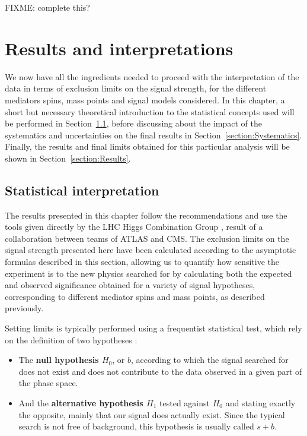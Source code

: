 \documentclass[a4paper, 10pt, openright]{report}
\begin{document}
\color{red}FIXME: complete this? \color{black}


















\chapter{Results and interpretations} \label{chapter:FinalResults}

We now have all the ingredients needed to proceed with the interpretation of the data in terms of exclusion limits on the signal strength, for the different mediators spins, mass points and signal models considered. In this chapter, a short but necessary theoretical introduction to the statistical concepts used will be performed in Section~\ref{section:Statistics}, before discussing about the impact of the systematics and uncertainties on the final results in Section~\ref{section:Systematics}. Finally, the results and final limits obtained for this particular analysis will be shown in Section~\ref{section:Results}.

\section{Statistical interpretation} \label{section:Statistics}

The results presented in this chapter follow the recommendations and use the tools given directly by the \ac{LHC} Higgs Combination Group \cite{combine}, result of a collaboration between teams of \ac{ATLAS} and \ac{CMS}. The exclusion limits on the signal strength presented here have been calculated according to the asymptotic formulas described in this section, allowing us to quantify how sensitive the experiment is to the new physics searched for by calculating both the expected and observed significance obtained for a variety of signal hypotheses, corresponding to different mediator spins and mass points, as described previously.

Setting limits is typically performed using a frequentist statistical test, which rely on the definition of two hypotheses \cite{stat1, stat2}: 
 
\begin{itemize} 
\item The \textbf{null hypothesis $H_0$}, or $b$, according to which the signal searched for does not exist and does not contribute to the data observed in a given part of the phase space.
\item And the \textbf{alternative hypothesis $H_1$} tested against $H_0$ and stating exactly the opposite, mainly that our signal does actually exist. Since the typical search
is not free of background, this hypothesis is usually called $s+b$.
\end{itemize}
\end{document}
